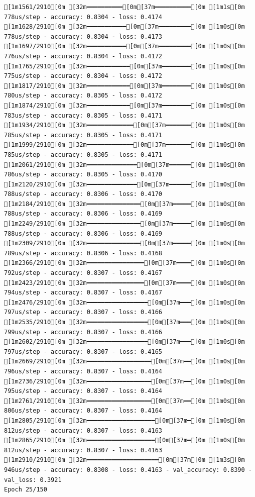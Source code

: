\documentclass[
  letterpaper,
  DIV=11,
  numbers=noendperiod]{scrartcl}
\begin{document}
\begin{verbatim}
[1m1561/2910[0m [32m━━━━━━━━━━[0m[37m━━━━━━━━━━[0m [1m1s[0m 778us/step - accuracy: 0.8304 - loss: 0.4174
[1m1628/2910[0m [32m━━━━━━━━━━━[0m[37m━━━━━━━━━[0m [1m0s[0m 778us/step - accuracy: 0.8304 - loss: 0.4173
[1m1697/2910[0m [32m━━━━━━━━━━━[0m[37m━━━━━━━━━[0m [1m0s[0m 776us/step - accuracy: 0.8304 - loss: 0.4172
[1m1765/2910[0m [32m━━━━━━━━━━━━[0m[37m━━━━━━━━[0m [1m0s[0m 775us/step - accuracy: 0.8304 - loss: 0.4172
[1m1817/2910[0m [32m━━━━━━━━━━━━[0m[37m━━━━━━━━[0m [1m0s[0m 780us/step - accuracy: 0.8305 - loss: 0.4172
[1m1874/2910[0m [32m━━━━━━━━━━━━[0m[37m━━━━━━━━[0m [1m0s[0m 783us/step - accuracy: 0.8305 - loss: 0.4171
[1m1934/2910[0m [32m━━━━━━━━━━━━━[0m[37m━━━━━━━[0m [1m0s[0m 785us/step - accuracy: 0.8305 - loss: 0.4171
[1m1999/2910[0m [32m━━━━━━━━━━━━━[0m[37m━━━━━━━[0m [1m0s[0m 785us/step - accuracy: 0.8305 - loss: 0.4171
[1m2061/2910[0m [32m━━━━━━━━━━━━━━[0m[37m━━━━━━[0m [1m0s[0m 786us/step - accuracy: 0.8305 - loss: 0.4170
[1m2120/2910[0m [32m━━━━━━━━━━━━━━[0m[37m━━━━━━[0m [1m0s[0m 788us/step - accuracy: 0.8306 - loss: 0.4170
[1m2184/2910[0m [32m━━━━━━━━━━━━━━━[0m[37m━━━━━[0m [1m0s[0m 788us/step - accuracy: 0.8306 - loss: 0.4169
[1m2249/2910[0m [32m━━━━━━━━━━━━━━━[0m[37m━━━━━[0m [1m0s[0m 788us/step - accuracy: 0.8306 - loss: 0.4169
[1m2309/2910[0m [32m━━━━━━━━━━━━━━━[0m[37m━━━━━[0m [1m0s[0m 789us/step - accuracy: 0.8306 - loss: 0.4168
[1m2366/2910[0m [32m━━━━━━━━━━━━━━━━[0m[37m━━━━[0m [1m0s[0m 792us/step - accuracy: 0.8307 - loss: 0.4167
[1m2423/2910[0m [32m━━━━━━━━━━━━━━━━[0m[37m━━━━[0m [1m0s[0m 794us/step - accuracy: 0.8307 - loss: 0.4167
[1m2476/2910[0m [32m━━━━━━━━━━━━━━━━━[0m[37m━━━[0m [1m0s[0m 797us/step - accuracy: 0.8307 - loss: 0.4166
[1m2535/2910[0m [32m━━━━━━━━━━━━━━━━━[0m[37m━━━[0m [1m0s[0m 799us/step - accuracy: 0.8307 - loss: 0.4166
[1m2602/2910[0m [32m━━━━━━━━━━━━━━━━━[0m[37m━━━[0m [1m0s[0m 797us/step - accuracy: 0.8307 - loss: 0.4165
[1m2669/2910[0m [32m━━━━━━━━━━━━━━━━━━[0m[37m━━[0m [1m0s[0m 796us/step - accuracy: 0.8307 - loss: 0.4164
[1m2736/2910[0m [32m━━━━━━━━━━━━━━━━━━[0m[37m━━[0m [1m0s[0m 795us/step - accuracy: 0.8307 - loss: 0.4164
[1m2761/2910[0m [32m━━━━━━━━━━━━━━━━━━[0m[37m━━[0m [1m0s[0m 806us/step - accuracy: 0.8307 - loss: 0.4164
[1m2805/2910[0m [32m━━━━━━━━━━━━━━━━━━━[0m[37m━[0m [1m0s[0m 812us/step - accuracy: 0.8307 - loss: 0.4163
[1m2865/2910[0m [32m━━━━━━━━━━━━━━━━━━━[0m[37m━[0m [1m0s[0m 812us/step - accuracy: 0.8307 - loss: 0.4163
[1m2910/2910[0m [32m━━━━━━━━━━━━━━━━━━━━[0m[37m[0m [1m3s[0m 946us/step - accuracy: 0.8308 - loss: 0.4163 - val_accuracy: 0.8390 - val_loss: 0.3921
Epoch 25/150


\end{verbatim}
\end{document}
